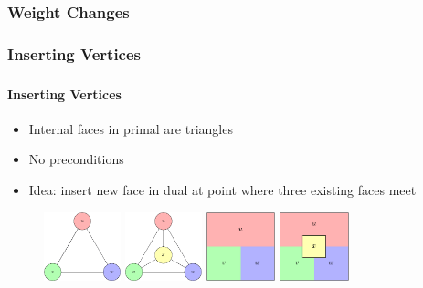 \documentclass[t,18pt]{beamer}
\begin{document}
\subsubsection{Weight Changes}
\label{subsubsect:weight-changes}

\subsubsection{Inserting Vertices}
\label{subsubsect:inserting-vertices}

\begin{frame}
  \frametitle{}
  \framesubtitle{Inserting Vertices}
  \begin{itemize}
    \item Internal faces in primal are triangles
    \item No preconditions
    \item Idea: insert new face in dual at point where three existing faces meet
  \end{itemize}
  \begin{figure}
    \includegraphics[height=2cm]{../Thesis/Resources/InsertVertex-Example-Inside-1.pdf}
    \quad
    \includegraphics[height=2cm]{../Thesis/Resources/InsertVertex-Example-Inside-2.pdf}
    \quad
    \includegraphics[height=2cm]{../Thesis/Resources/InsertVertex-Example-Inside-3.pdf}
    \quad
    \includegraphics[height=2cm]{../Thesis/Resources/InsertVertex-Example-Inside-4.pdf}
  \end{figure}
\end{frame}
\end{document}

